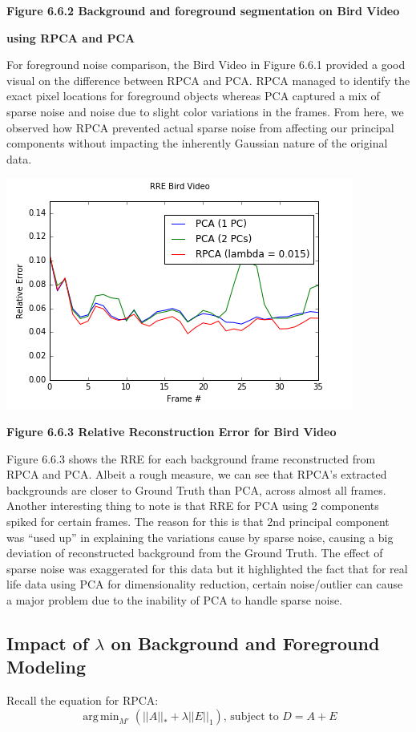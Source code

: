 \documentclass[11pt]{scrartcl} %
\DeclareMathOperator*{\argmin}{arg\,min}
\theoremstyle{plain}
\begin{document}
\begin{minipage}{\linewidth}
\begin{tabular}{ | c | m{2.8cm} | m{2.8cm} | m{2.8cm} | }
  \end{tabular}

\bigskip
\centerline{\textbf{Figure 6.6.2 Background and foreground segmentation on Bird Video }}
\centerline{\textbf{using RPCA and PCA}}
\bigskip
\egroup
\end{minipage}
For foreground noise comparison, the Bird Video in Figure 6.6.1 provided a good visual on the difference between RPCA and PCA. RPCA managed to identify the exact pixel locations for foreground objects whereas PCA captured a mix of sparse noise and noise due to slight color variations in the frames. From here, we observed how RPCA prevented actual sparse noise from affecting our principal components without impacting the inherently Gaussian nature of the original data.

\centerline{\includegraphics[width=\linewidth, width=100mm]{figures_video/crow/rre_015.png}}
\centerline{\textbf{Figure 6.6.3 Relative Reconstruction Error for Bird Video }}
\bigskip

Figure 6.6.3 shows the RRE for each background frame reconstructed from RPCA and PCA. Albeit a rough measure, we can see that RPCA’s extracted backgrounds are closer to Ground Truth than PCA, across almost all frames. Another interesting thing to note is that RRE for PCA using 2 components spiked for certain frames. The reason for this is that 2nd principal component was “used up” in explaining the variations cause by sparse noise, causing a big deviation of reconstructed background from the Ground Truth. The effect of sparse noise was exaggerated for this data but it highlighted the fact that for real life data using PCA for dimensionality reduction, certain noise/outlier can cause a major problem due to the inability of PCA to handle sparse noise.

\subsection{Impact of $\lambda$ on Background and Foreground Modeling}
Recall the equation for RPCA:
\[ \argmin_{M'}(||A||_* + \lambda||E||_1) \text{,  subject to  }  D = A + E \]
\end{document}

